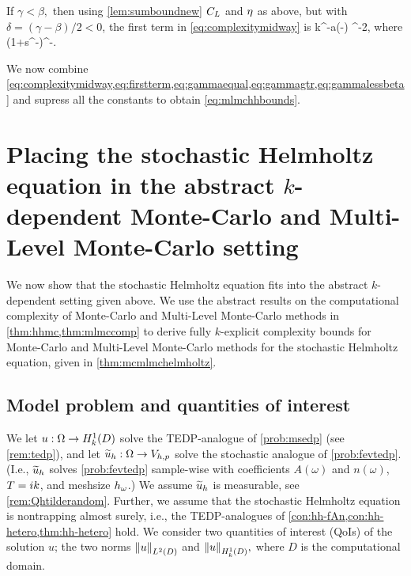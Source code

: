 If $\gamma < \beta,$ then using \cref{lem:sumboundnew} $C_{L}$ and $\eta$ as above, but with $\delta = (\gamma-\beta)/2 < 0$, the first term in \eqref{eq:complexitymidway} is
\beq\label{eq:gammalessbeta}
\Cgammalessbeta k^{\tau  -a\mleft(\beta-\gamma\mright)} \eps^{-2},
\eeq
where
\beqs\label{eq:gammaless}
\Cgammalessbeta {}\ct \cth \mleft(1+s^{-\gamma}\mright)\Ccoarse^{\beta-\gamma}.
\eeqs

We now combine \cref{eq:complexitymidway,eq:firstterm,eq:gammaequal,eq:gammagtr,eq:gammalessbeta} and supress all the constants to obtain \cref{eq:mlmchhbounds}.
\epf



\section[The Helmholtz equation in the abstract setting]{Placing the stochastic Helmholtz equation in the abstract $k$-dependent Monte-Carlo and Multi-Level Monte-Carlo setting}\label{sec:mlmcapplying}

We now show that the stochastic Helmholtz equation fits into the abstract $k$-dependent setting given above. We use the abstract results on the computational complexity of Monte-Carlo and Multi-Level Monte-Carlo methods in \cref{thm:hhmc,thm:mlmccomp} to derive fully $k$-explicit complexity bounds for Monte-Carlo and Multi-Level Monte-Carlo methods for the stochastic Helmholtz equation, given in \cref{thm:mcmlmchelmholtz}.

\subsection{Model problem and quantities of interest}\label{sec:mlmcmodel}

We let $u:\Omega\rightarrow\HokD$ solve the TEDP-analogue of \cref{prob:msedp} (see \cref{rem:tedp}), and let $\widetilde{u}_{h}:\Omega\rightarrow V_{h,p}$ solve the stochastic analogue of \cref{prob:fevtedp}. (I.e., $\widetilde{u}_{h}$ solves \cref{prob:fevtedp} sample-wise with coefficients $A(\omega)$ and $n(\omega)$, $T = ik$, and meshsize $h_{\omega}$.) We assume $\widetilde{u}_{h}$ is measurable, see \cref{rem:Qhtilderandom}. Further, we assume that the stochastic Helmholtz equation is nontrapping almost surely, i.e., the TEDP-analogues of \cref{con:hh-fAn,con:hh-hetero,thm:hh-hetero} hold. We consider two quantities of interest (QoIs) of the solution $u$; the two norms $\NLtD{u}$ and $\NHokD{u},$ where $D$ is the computational domain.

